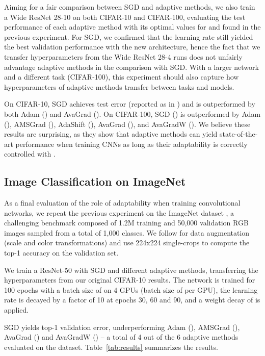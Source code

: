 \documentclass{article}
\begin{document}
Aiming for a fair comparison between SGD and adaptive methods, we also train a Wide ResNet 28-10 on both
CIFAR-10 and CIFAR-100, evaluating the test performance of each adaptive method with its
optimal values for  and  found in the previous experiment. For SGD, we confirmed that the learning  rate  still yielded the best validation performance with the new architecture, hence the fact that we transfer hyperparameters from the Wide ResNet 28-4 runs does not unfairly advantage adaptive methods in the comparison with SGD. With a larger network and a different task (CIFAR-100), this experiment should
also capture how hyperparameters of adaptive methods transfer between tasks and
models.

On CIFAR-10, SGD achieves  test error (reported as  in
\citet{wide}) and is outperformed by both
      Adam () and
   AvaGrad ().
On CIFAR-100, SGD () is outperformed by
    Adam (),
 AMSGrad (),
 AdaShift (),
 AvaGrad (), and
AvaGradW ().
We believe these results are surprising, as they show that adaptive methods
can yield state-of-the-art performance when training CNNs as long as their
adaptability is correctly controlled with .

\subsection{Image Classification on ImageNet}

As a final evaluation of the role of adaptability when training convolutional
networks, we repeat the previous experiment on the ImageNet dataset
\citep{imagenet}, a challenging benchmark composed of 1.2M training and 50,000 validation RGB images sampled from a total of 1,000 classes. We follow \citet{gross} for data augmentation (scale and color transformations) and use 224x224 single-crops to compute the top-1 accuracy on the validation set.

We train a ResNet-50 \citep{resnet2} with SGD and different
adaptive methods, transferring the hyperparameters from our original CIFAR-10
results.  The network is trained for 100 epochs
with a batch size of  on 4 GPUs (batch size of  per GPU), the learning rate is decayed by a factor of 10 at
epochs 30, 60 and 90, and a weight decay of  is applied. 

SGD yields
 top-1 validation error, underperforming
    Adam (),
 AMSGrad (),
 AvaGrad () and
AvaGradW () -- a total of 4 out of the 6 adaptive methods evaluated on the dataset. Table~\ref{tab:results} summarizes the results.
\end{document}
